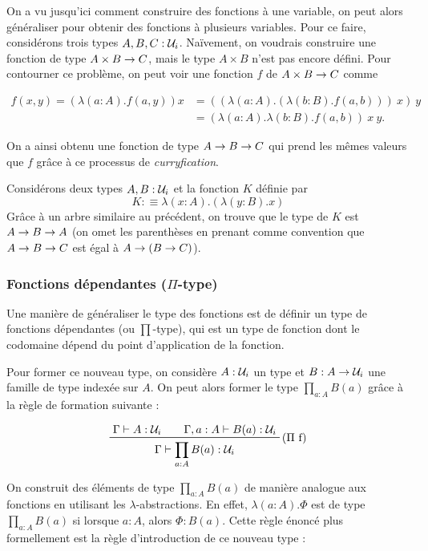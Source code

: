 \documentclass[../../rapport.tex]{subfiles}
\begin{document}
  On a vu jusqu'ici comment construire des fonctions à une variable, on peut alors généraliser pour obtenir
  des fonctions à plusieurs variables.
  Pour ce faire, considérons trois types $A, B, C : \mathcal U_i$.
  Naïvement, on voudrais construire une fonction de type $A \times B \rightarrow C$,
  mais le type $A \times B$ n'est pas encore défini.
  Pour contourner ce problème, on peut voir une fonction $f$ de $A \times B \rightarrow C$ comme

  \begin{align}
    f(x, y) = (\lambda(a : A). f(a, y)) x &= ((\lambda(a : A). (\lambda(b : B). f(a, b)))\ x)\ y \\ 
					  &= (\lambda(a : A).\lambda(b : B). f(a, b))\ x\ y.
  \end{align}

  On a ainsi obtenu une fonction de type $A \rightarrow B \rightarrow C$ qui prend les mêmes valeurs que $f$
  grâce à ce processus de \textit{curryfication}.

  \begin{example}
    Considérons deux types $A, B : \mathcal U_i$ et la fonction $K$ définie par
    $$K :\equiv \lambda(x : A).(\lambda(y : B).x)$$
    Grâce à un arbre similaire au précédent, on trouve que le type de $K$ est $A \rightarrow B \rightarrow A$
    (on omet les parenthèses en prenant comme convention que $A \rightarrow B \rightarrow C$ est égal à $A \rightarrow (B \rightarrow C)$).
  \end{example}

  \subsubsection{Fonctions dépendantes ($\Pi$-type)}

  Une manière de généraliser le type des fonctions est de définir un type de fonctions dépendantes (ou $\prod$-type),
  qui est un type de fonction dont le codomaine dépend du point d'application de la fonction.

  Pour former ce nouveau type, on considère $A : \mathcal U_i$ un type et $B : A \rightarrow \mathcal U_i$ une famille de type indexée sur $A$.
  On peut alors former le type $\prod_{a : A}{B(a)}$ grâce à la règle de formation suivante :

  $$
  \prfinterspace=2em
  \prftree[r]{($\Pi$ f)}{\Gamma \vdash A : \U_i}{\Gamma, a : A \vdash B(a) : \U_i}
    {\Gamma \vdash \prod_{a:A}{B(a)} : \U_i}
  $$

  On construit des éléments de type $\prod_{a:A}{B(a)}$ de manière analogue aux fonctions en utilisant les $\lambda$-abstractions.
  En effet, $\lambda(a : A). \Phi$ est de type $\prod_{a:A}{B(a)}$ si lorsque $a : A$, alors $\Phi : B(a)$.
  Cette règle énoncé plus formellement est la règle d'introduction de ce nouveau type :
\end{document}
